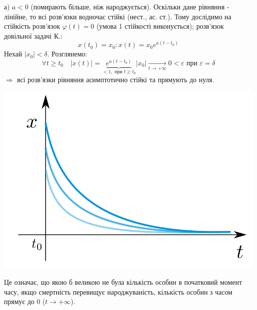а) $a < 0$ (помирають більше, ніж народжується). Оскільки дане рівняння - лінійне, то всі розв'язки водночас стійкі (нест., ас. ст.). Тому дослідимо на стійкість розв'язок $ \varphi(t) = 0$ (умова 1 стійкості виконується); розв'язок довільної задачі К.:
$$
x(t_0) = x_0 : x(t) = x_0 e^{a (t-t_0)}
$$
Нехай $ \left| x_0 \right| < \delta.$ Розглянемо:
$$
\forall t \geq t_0 \quad \left| x (t) \right| = \underbrace{e^{a(t-t_0)}}_{<1, \text{ при } t\geq t_0} \left| x_0 \right| \xrightarrow[t\to + \infty]{} 0 < \varepsilon \text{ при } \varepsilon = \delta
$$
$\Rightarrow $ всі розв'язки рівняння асимптотично стійкі та прямують до нуля.\\
\begin{center} \includegraphics[scale=0.2]{assets/lectures_recent-562c17da.png} \end{center}
Це означає, що якою б великою не була кількість особин в початковий момент часу, якщо смертність перевищує народжуваність, кількість особин з часом прямує до 0 ($t \to + \infty$).

